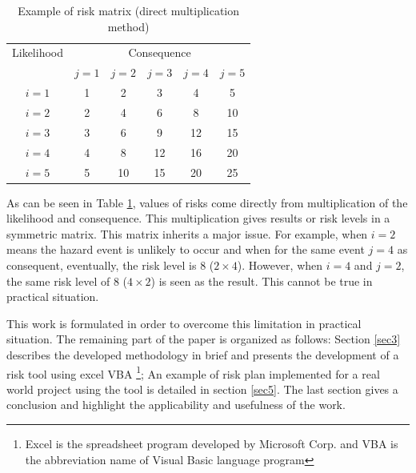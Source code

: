 \documentclass[10pt,halfline,a4paper]{ouparticle}
\begin{document}
\begin{table}
\centering
\caption{Example of risk matrix (direct multiplication method)} 
\begin{tabular}{l|l|l|l|l|l}
\hline
\multicolumn{1}{c|}{Likelihood} & \multicolumn{5}{c}{Consequence} \\ 
\cline{2-6}
\multicolumn{1}{c|}{} & \multicolumn{1}{c|}{$j=1$} & \multicolumn{1}{c|}{$j=2$} & \multicolumn{1}{c|}{$j=3$} & \multicolumn{1}{c|}{$j=4$} & \multicolumn{1}{c}{$j=5$} \\ 
\hline
\multicolumn{1}{c|}{$i=1$} & \multicolumn{1}{c|}{1} & \multicolumn{1}{c|}{2} & \multicolumn{1}{c|}{3} & \multicolumn{1}{c|}{4} & \multicolumn{1}{c}{5} \\ 
\multicolumn{1}{c|}{$i=2$} & \multicolumn{1}{c|}{2} & \multicolumn{1}{c|}{4} & \multicolumn{1}{c|}{6} & \multicolumn{1}{c|}{8} & \multicolumn{1}{c}{10} \\ 
\multicolumn{1}{c|}{$i=3$} & \multicolumn{1}{c|}{3} & \multicolumn{1}{c|}{6} & \multicolumn{1}{c|}{9} & \multicolumn{1}{c|}{12} & \multicolumn{1}{c}{15} \\ 
\multicolumn{1}{c|}{$i=4$} & \multicolumn{1}{c|}{4} & \multicolumn{1}{c|}{8} & \multicolumn{1}{c|}{12} & \multicolumn{1}{c|}{16} & \multicolumn{1}{c}{20} \\ 
\multicolumn{1}{c|}{$i=5$} & \multicolumn{1}{c|}{5} & \multicolumn{1}{c|}{10} & \multicolumn{1}{c|}{15} & \multicolumn{1}{c|}{20} & \multicolumn{1}{c}{25} \\ 
\hline
\end{tabular}
\label{tbl_riskmatrix}
\end{table}
As can be seen in Table \ref{tbl_riskmatrix}, values of risks come directly from multiplication of the likelihood and consequence. This multiplication gives results or risk levels in a symmetric matrix. This matrix inherits a major issue. For example, when $i=2$ means the hazard event is unlikely to occur and when for the same event $j=4$ as consequent, eventually, the risk level is $8$ ($2\times4$). However, when $i=4$ and $j=2$, the same risk level of $8$ ($4 \times 2$) is seen as the result. This cannot be true in practical situation. 

This work is formulated in order to overcome this limitation in practical situation. The remaining part of the paper is organized as follows: Section \ref{sec3} describes the developed methodology in brief and presents the development of a risk tool using excel VBA \footnote{Excel is the spreadsheet program developed by Microsoft Corp. and VBA is the abbreviation name of Visual Basic language program}; An example of risk plan implemented for a real world project using the tool is detailed in section \ref{sec5}. The last section gives a conclusion and highlight the applicability and usefulness of the work.
\end{document}
